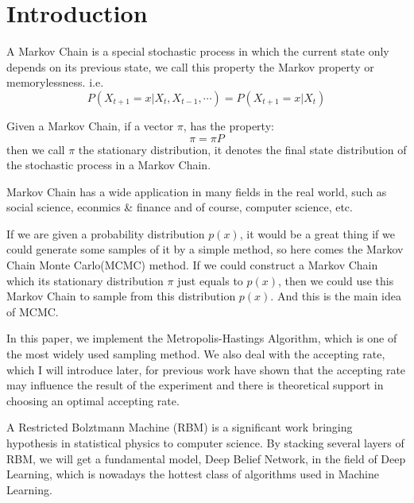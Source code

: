


\section{Introduction} \label{sec:introduction}

A Markov Chain is a special stochastic process in which the current state only depends on its previous state, we call this property the Markov property or memorylessness. i.e.
\begin{equation}
P(X_{t+1}=x|X_t, X_{t-1}, \cdots) =P(X_{t+1}=x|X_t)
\end{equation}

Given a Markov Chain, if a vector $\pi$, has the property:
\begin{equation}
\pi=\pi P
\end{equation}
then we call $\pi$ the stationary distribution, it denotes the final state distribution of the stochastic process in a Markov Chain.

Markov Chain has a wide application in many fields in the real world, such as social science\cite{acemoglu2011political}, econmics \& finance\cite{hamilton1989new} and of course, computer science\cite{page1999pagerank}, etc.

If we are given a probability distribution $p(x)$, it would be a great thing if we could generate some samples of it by a simple method, so here comes the Markov Chain Monte Carlo(MCMC) method. If we could construct a Markov Chain which its stationary distribution $\pi$ just equals to $p(x)$, then we could use this Markov Chain to sample from this distribution $p(x)$. And this is the main idea of MCMC.

In this paper, we implement the Metropolis-Hastings Algorithm\cite{metropolis1953equation,hastings1970monte}, which is one of the most widely used sampling method. We also deal with the accepting rate, which I will introduce later, for previous work\cite{roberts1997weak} have shown that the accepting rate may influence the result of the experiment and there is theoretical support in choosing an optimal accepting rate.

A Restricted Bolztmann Machine (RBM)\cite{mcclelland1987parallel} is a significant work bringing hypothesis in statistical physics to computer science. By stacking several layers of RBM, we will get a fundamental model, Deep Belief Network\cite{hinton2006reducing}, in the field of Deep Learning, which is nowadays the hottest class of algorithms used in Machine Learning.

